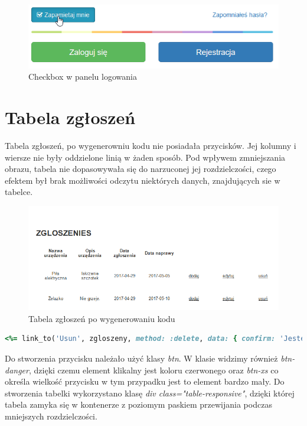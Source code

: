 \documentclass[openright]{xmgr}
\begin{document}
\begin{figure}[!tbh]
	\centering
	\includegraphics[width=\linewidth]{image/checkbox}
	\caption{Checkbox w panelu logowania}
\end{figure}	

\newpage	
	\section{Tabela zgłoszeń}
	
	Tabela zgłoszeń, po wygenerowniu kodu nie posiadała przycisków. Jej kolumny i wiersze nie były oddzielone linią w żaden sposób. Pod wpływem zmniejszania obrazu, tabela nie dopasowywała się do narzuconej jej rozdzielczości, czego efektem był brak możliwości odczytu niektórych danych, znajdujących sie w tabelce. 
	
	\begin{figure}[!tbh]
		\centering
		\includegraphics[width=\linewidth]{image/zgloszenie}
		\caption{Tabela zgłoszeń po wygenerowaniu kodu}
	\end{figure}

	\begin{lstlisting}[language=Ruby,lineskip={-1pt},caption=Element klikalny w tabeli zgłoszeń]
	<%= link_to('Usun', zgloszeny, method: :delete, data: { confirm: 'Jestes pewny?' }, class:'btn btn-danger btn-xs') %>
	\end{lstlisting}
	
	Do stworzenia przycisku należało użyć klasy \textit{btn}. W klasie widzimy również \textit{btn-danger}, dzięki czemu element klikalny jest koloru czerwonego oraz \textit{btn-xs} co określa wielkość przycisku w tym przypadku jest to element bardzo mały. 
\newpage
	Do stworzenia tabelki wykorzystano klasę \textit{div class="table-responsive"}, dzięki której tabela zamyka się w kontenerze z poziomym paskiem przewijania podczas mniejszych rozdzielczości.
		
\end{document}
